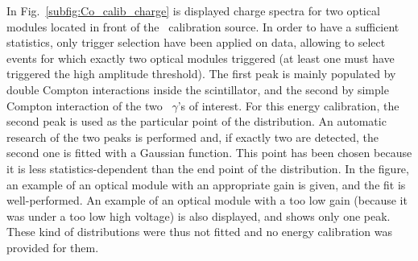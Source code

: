 In Fig.~\ref{subfig:Co_calib_charge} is displayed charge spectra for two optical modules located in front of the \Co\ calibration source.
In order to have a sufficient statistics, only trigger selection have been applied on data, allowing to select events for which exactly two optical modules triggered (at least one must have triggered the high amplitude threshold).
The first peak is mainly populated by double Compton interactions inside the scintillator, and the second by simple Compton interaction of the two \Co\ $\gamma$'s of interest.
For this energy calibration, the second peak is used as the particular point of the distribution.
An automatic research of the two peaks is performed and, if exactly two are detected, the second one is fitted with a Gaussian function.
This point has been chosen because it is less statistics-dependent than the end point of the distribution.
In the figure, an example of an optical module with an appropriate gain is given, and the fit is well-performed.
An example of an optical module with a too low gain (because it was under a too low high voltage) is also displayed, and shows only one peak.
These kind of distributions were thus not fitted and no energy calibration was provided for them.
